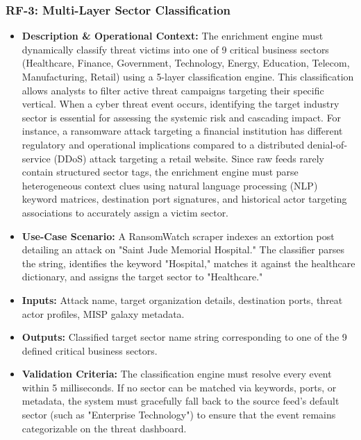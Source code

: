 \subsubsection{RF-3: Multi-Layer Sector Classification}
\begin{itemize}
    \item \textbf{Description \& Operational Context:} The enrichment engine must dynamically classify threat victims into one of 9 critical business sectors (Healthcare, Finance, Government, Technology, Energy, Education, Telecom, Manufacturing, Retail) using a 5-layer classification engine. This classification allows analysts to filter active threat campaigns targeting their specific vertical. When a cyber threat event occurs, identifying the target industry sector is essential for assessing the systemic risk and cascading impact. For instance, a ransomware attack targeting a financial institution has different regulatory and operational implications compared to a distributed denial-of-service (DDoS) attack targeting a retail website. Since raw feeds rarely contain structured sector tags, the enrichment engine must parse heterogeneous context clues using natural language processing (NLP) keyword matrices, destination port signatures, and historical actor targeting associations to accurately assign a victim sector.
    \item \textbf{Use-Case Scenario:} A RansomWatch scraper indexes an extortion post detailing an attack on "Saint Jude Memorial Hospital." The classifier parses the string, identifies the keyword "Hospital," matches it against the healthcare dictionary, and assigns the target sector to "Healthcare."
    \item \textbf{Inputs:} Attack name, target organization details, destination ports, threat actor profiles, MISP galaxy metadata.
    \item \textbf{Outputs:} Classified target sector name string corresponding to one of the 9 defined critical business sectors.
    \item \textbf{Validation Criteria:} The classification engine must resolve every event within 5 milliseconds. If no sector can be matched via keywords, ports, or metadata, the system must gracefully fall back to the source feed's default sector (such as "Enterprise Technology") to ensure that the event remains categorizable on the threat dashboard.
\end{itemize}

